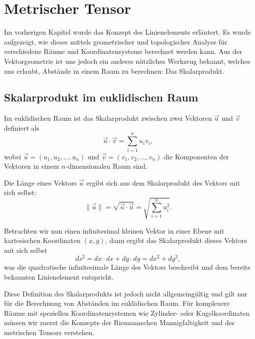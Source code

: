 %
%
%
\section{Metrischer Tensor
\label{geodaeten:section:MetrischerTensor}}

Im vorherigen Kapitel wurde das Konzept des Linienelements erläutert.
Es wurde aufgezeigt, wie dieses mittels geometrischer und topologischer Analyse für verschiedene Räume und Koordinatensysteme berechnet werden kann.
Aus der Vektorgeometrie ist uns jedoch ein anderes nützliches Werkzeug bekannt, welches uns erlaubt, Abstände in einem Raum zu berechnen: Das Skalarprodukt.

\subsection{Skalarprodukt im euklidischen Raum}

Im euklidischen Raum ist das Skalarprodukt zwischen zwei Vektoren $\vec{u}$ und $\vec{v}$ definiert als
\begin{equation}
	\vec{u} \cdot \vec{v} = \sum_{i=1}^n u_i v_i,
\end{equation}
wobei $\vec{u} = (u_1, u_2, \ldots, u_n)$ und $\vec{v} = (v_1, v_2, \ldots, v_n)$ die Komponenten der Vektoren in einem $n$-dimensionalen Raum sind.

Die Länge eines Vektors $\vec{u}$ ergibt sich aus dem Skalarprodukt des Vektors mit sich selbst:
\begin{equation}
	\|\vec{u}\| = \sqrt{\vec{u} \cdot \vec{u}} = \sqrt{\sum_{i=1}^n u_i^2}. 
\end{equation}

Betrachten wir nun einen infinitesimal kleinen Vektor in einer Ebene mit kartesischen Koordinaten $(x, y)$, dann ergibt das Skalarprodukt dieses Vektors mit sich selbst
\begin{equation}
	ds^2 = dx \cdot dx + dy \cdot dy = dx^2 + dy^2,
\end{equation}
was die quadratische infinitesimale Länge des Vektors beschreibt und dem bereits bekannten Linienelement entspricht.

Diese Definition des Skalarprodukts ist jedoch nicht allgemeingültig und gilt nur für die Berechnung von Abständen im euklidischen Raum.
Für komplexere Räume mit speziellen Koordinatensystemen wie Zylinder- oder Kugelkoordinaten müssen wir zuerst die Konzepte der Riemannschen Mannigfaltigkeit und des metrischen Tensors verstehen.

